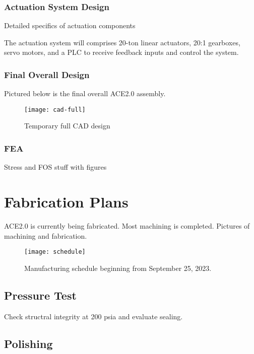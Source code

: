 \subsubsection{Actuation System Design}

Detailed specifics of actuation components

The actuation system will comprises 20-ton linear actuators, 20:1 gearboxes, servo motors, and a PLC to receive feedback inputs and control the system.

\subsubsection{Final Overall Design}

Pictured below is the final overall ACE2.0 assembly.

\begin{figure}[ht]
    \centering
    \texttt{[image: cad-full]}
    \caption{Temporary full CAD design}
    \label{fig:cad-full}
\end{figure}

\subsubsection{FEA}

Stress and FOS stuff with figures

\section{Fabrication Plans}

ACE2.0 is currently being fabricated. Most machining is completed. Pictures of machining and fabrication.

\begin{figure}[ht]
    \centering
    \texttt{[image: schedule]}
    \caption{Manufacturing schedule beginning from September 25, 2023.}
    \label{fig:schedule}
\end{figure}

\subsection{Pressure Test}

Check structral integrity at 200 psia and evaluate sealing.

\subsection{Polishing}

